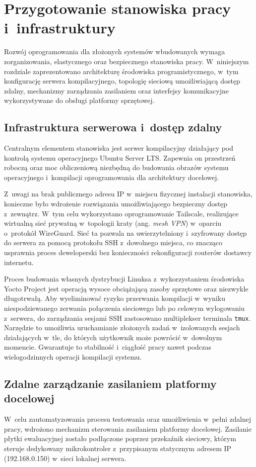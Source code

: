 \chapter{Przygotowanie stanowiska pracy i~infrastruktury}
\label{ch:stanowisko}

Rozwój oprogramowania dla złożonych systemów wbudowanych wymaga zorganizowania, elastycznego oraz bezpiecznego stanowiska pracy. W~niniejszym rozdziale zaprezentowano architekturę środowiska programistycznego, w~tym konfigurację serwera kompilacyjnego, topologię sieciową umożliwiającą dostęp zdalny, mechanizmy zarządzania zasilaniem oraz interfejsy komunikacyjne wykorzystywane do obsługi platformy sprzętowej.

\section{Infrastruktura serwerowa i~dostęp zdalny}
Centralnym elementem stanowiska jest serwer kompilacyjny działający pod kontrolą systemu operacyjnego Ubuntu Server LTS. Zapewnia on przestrzeń roboczą oraz moc obliczeniową niezbędną do budowania obrazów systemu operacyjnego i~kompilacji oprogramowania dla architektury docelowej. 

Z~uwagi na brak publicznego adresu IP w~miejscu fizycznej instalacji stanowiska, konieczne było wdrożenie rozwiązania umożliwiającego bezpieczny dostęp z~zewnątrz. W~tym celu wykorzystano oprogramowanie Tailscale, realizujące wirtualną sieć prywatną w~topologii kraty (ang. \textit{mesh VPN}) w~oparciu o~protokół WireGuard. Sieć ta pozwala na uwierzytelniony i~szyfrowany dostęp do serwera za pomocą protokołu SSH z~dowolnego miejsca, co znacząco usprawnia proces deweloperski bez konieczności rekonfiguracji routerów dostawcy internetu.

Proces budowania własnych dystrybucji Linuksa z~wykorzystaniem środowiska Yocto Project jest operacją wysoce obciążającą zasoby sprzętowe oraz niezwykle długotrwałą. Aby wyeliminować ryzyko przerwania kompilacji w~wyniku niespodziewanego zerwania połączenia sieciowego lub po celowym wylogowaniu z~serwera, do zarządzania sesjami SSH zastosowano multiplekser terminala \texttt{tmux}. Narzędzie to umożliwia uruchamianie złożonych zadań w~izolowanych sesjach działających w~tle, do których użytkownik może powrócić w~dowolnym momencie. Gwarantuje to stabilność i~ciągłość pracy nawet podczas wielogodzinnych operacji kompilacji systemu.

\section{Zdalne zarządzanie zasilaniem platformy docelowej}
W~celu zautomatyzowania procesu testowania oraz umożliwienia w~pełni zdalnej pracy, wdrożono mechanizm sterowania zasilaniem platformy docelowej. Zasilanie płytki ewaluacyjnej zostało podłączone poprzez przekaźnik sieciowy, którym steruje dedykowany mikrokontroler z~przypisanym statycznym adresem IP (192.168.0.150) w~sieci lokalnej serwera. 


